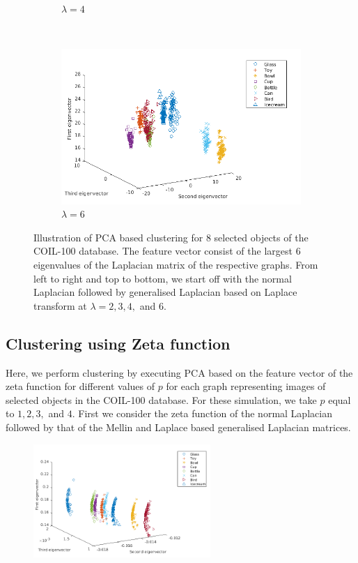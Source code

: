 \documentclass[10pt,a4paper]{article}
\begin{document}
\begin{figure}[H]
\begin{subfigure}[b]{0.5\textwidth}
		\caption{$\lambda=4$}
		\label{}
	\end{subfigure}~
	\begin{subfigure}[b]{0.5\textwidth}
		\includegraphics[width= \textwidth]{images/Laplace-lam6.png}
		\caption{$\lambda=6$}
		\label{}
	\end{subfigure}
	\caption{Illustration of PCA based clustering for $8$ selected objects of the COIL-100 database. The feature vector consist of the largest $6$ eigenvalues of the Laplacian matrix of the respective graphs. From left to right and top to bottom, we start off with the normal Laplacian followed by generalised Laplacian based on Laplace transform at $\lambda =2,3,4,$ and $6$. }
	\label{}
\end{figure}


\subsection{Clustering using Zeta function}
Here, we perform clustering by executing PCA based on the feature vector of the zeta function for different values of $p$ for each graph representing images of selected objects in the COIL-100 database. For these simulation, we take $p$ equal to $1,2,3,$ and $4$. First we consider the zeta function of the normal Laplacian followed by that of the Mellin and Laplace based generalised Laplacian matrices.
\begin{figure}[H]
	\centering
	\includegraphics[width=0.6\textwidth]{images/Zeta-nolongrange.png}
	\caption{}
	\label{}
\end{figure}
\end{document}
